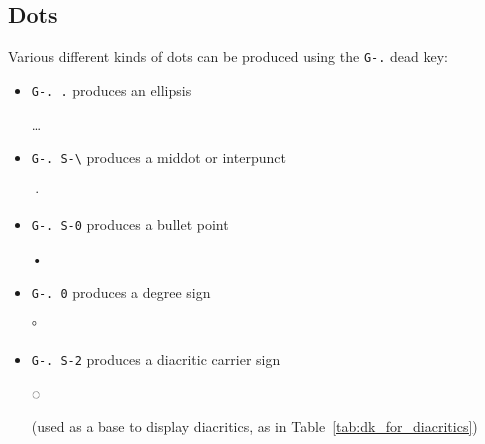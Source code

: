 \documentclass[oneside]{memoir}
\newcommand{\key}{\verb}
\newcommand{\out}[1]{\colorbox{gray!20}{\strut{}#1}}
\begin{document}
\subsection{Dots}
\label{sec:dots}

Various different kinds of dots can be produced using the \key|G-.| dead key:

\begin{itemize}[noitemsep]
\item \key|G-. .| produces an ellipsis \out{…}
\item \key|G-. S-\| produces a middot or interpunct \out{·}
\item \key|G-. S-0| produces a bullet point \out{•}
\item \key|G-. 0| produces a degree sign \out{°}
\item \key|G-. S-2| produces a diacritic carrier sign \out{◌}
  (used as a base to display diacritics, as in Table~\ref{tab:dk_for_diacritics})
\end{itemize}
\end{document}
